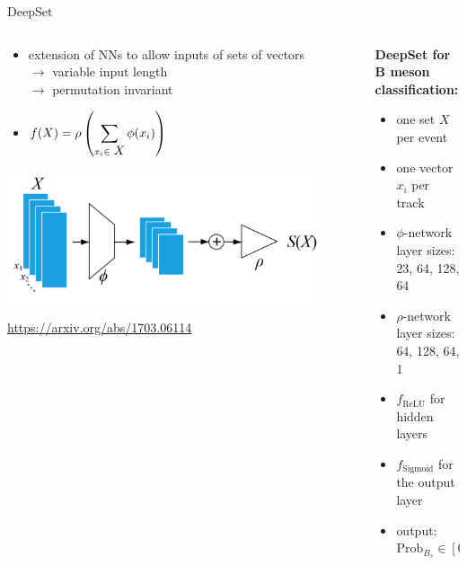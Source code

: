 \documentclass[aspectratio=1610, 10pt]{beamer}
\begin{document}
\begin{frame}{DeepSet}
  \begin{columns}
    \begin{column}{0.5\textwidth}
      \begin{itemize}
        \item extension of NNs to allow inputs of sets of vectors \\
        $\rightarrow$ variable input length \\
        $\rightarrow$ permutation invariant
        \item $\displaystyle f(X) = \rho \left( \sum_{x_i \in \text{ \normalsize{$X$}}} \phi(x_i) \right)$
      \end{itemize}

      \medskip
      \centering
      \includegraphics[width=0.9\textwidth]{images/DeepSet_schematic.png}

      \tiny \url{https://arxiv.org/abs/1703.06114}
    \end{column}
    \begin{column}{0.5\textwidth}
      \pause
      \textbf{DeepSet for B meson classification:}
      \begin{itemize}
        \item one set $X$ per event
        \item one vector $x_i$ per track
        \item $\phi$-network layer sizes: 23, 64, 128, 64
        \item $\rho$-network layer sizes: 64, 128, 64, 1
        \item $f_\text{ReLU}$ for hidden layers  
        \item $f_\text{Sigmoid}$ for the output layer
        \item output: $\text{Prob}_{B_s} \in [0,1]$
      \end{itemize}
    \end{column}
  \end{columns}
\end{frame}
\end{document}
